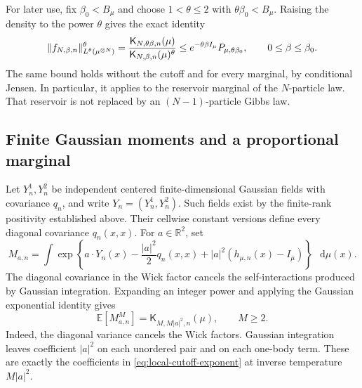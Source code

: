 \documentclass[11pt,reqno]{amsart}
\numberwithin{equation}{section}
\theoremstyle{plain}
\theoremstyle{definition}
\DeclarePairedDelimiter{\norm}{\lVert}{\rVert}
\newcommand{\dd}{\mathop{}\!\mathrm d}
\newcommand{\R}{\mathbb R}
\newcommand{\E}{\mathbb E}
\newcommand{\be}{\beta}
\newcommand{\K}{\mathsf K}
\begin{document}
For later use, fix $\be_0<B_\mu$ and choose $1<\theta\leq2$ with $\theta\be_0<B_\mu$. Raising the density to the power $\theta$ gives the exact identity
\begin{equation}
 \norm{f_{N,\be,n}}_{L^\theta(\mu^{\otimes N})}^\theta
 =\frac{\K_{N,\theta\be,n}(\mu)}{\K_{N,\be,n}(\mu)^\theta}
 \leq e^{-\theta\be I_\mu}P_{\mu,\theta\be_0},
 \qquad 0\leq\be\leq\be_0.
 \label{eq:local-full-density-buffer}
\end{equation}
The same bound holds without the cutoff and for every marginal, by conditional Jensen. In particular, it applies to the reservoir marginal of the $N$-particle law. That reservoir is not replaced by an $(N-1)$-particle Gibbs law.

\subsection{Finite Gaussian moments and a proportional marginal}
\label{subsec:local-replicas}

Let $Y_n^1,Y_n^2$ be independent centered finite-dimensional Gaussian fields with covariance $q_n$, and write $Y_n=(Y_n^1,Y_n^2)$. Such fields exist by the finite-rank positivity established above. Their cellwise constant versions define every diagonal covariance $q_n(x,x)$. For $a\in\R^2$, set
\begin{equation}
 M_{a,n}=\int\exp\left\{a\cdot Y_n(x)
 -\frac{|a|^2}{2}q_n(x,x)+|a|^2(h_{\mu,n}(x)-I_\mu)\right\}\,\dd\mu(x).
 \label{eq:local-Gaussian-mass}
\end{equation}
The diagonal covariance in the Wick factor cancels the self-interactions produced by Gaussian integration. Expanding an integer power and applying the Gaussian exponential identity gives
\begin{equation}
 \E[M_{a,n}^M]=\K_{M,M|a|^2,n}(\mu),\qquad M\geq2.
 \label{eq:local-integer-Wick-identity}
\end{equation}
Indeed, the diagonal variance cancels the Wick factors. Gaussian integration leaves coefficient $|a|^2$ on each unordered pair and on each one-body term. These are exactly the coefficients in \eqref{eq:local-cutoff-exponent} at inverse temperature $M|a|^2$.
\end{document}
